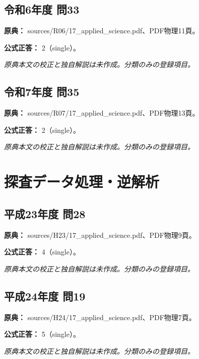 \subsection{令和6年度 問33}
\label{q:r06-reg-applied-33}

\noindent\textbf{原典：} sources/R06/17\_applied\_science.pdf、PDF物理11頁。

\textbf{公式正答：} 2（single）。

\par\textit{原典本文の校正と独自解説は未作成。分類のみの登録項目。}

\subsection{令和7年度 問35}
\label{q:r07-reg-applied-35}

\noindent\textbf{原典：} sources/R07/17\_applied\_science.pdf、PDF物理13頁。

\textbf{公式正答：} 2（single）。

\par\textit{原典本文の校正と独自解説は未作成。分類のみの登録項目。}

\section{探査データ処理・逆解析}

\subsection{平成23年度 問28}
\label{q:h23-reg-applied-28}

\noindent\textbf{原典：} sources/H23/17\_applied\_science.pdf、PDF物理9頁。

\textbf{公式正答：} 4（single）。

\par\textit{原典本文の校正と独自解説は未作成。分類のみの登録項目。}

\subsection{平成24年度 問19}
\label{q:h24-reg-applied-19}

\noindent\textbf{原典：} sources/H24/17\_applied\_science.pdf、PDF物理7頁。

\textbf{公式正答：} 5（single）。

\par\textit{原典本文の校正と独自解説は未作成。分類のみの登録項目。}

